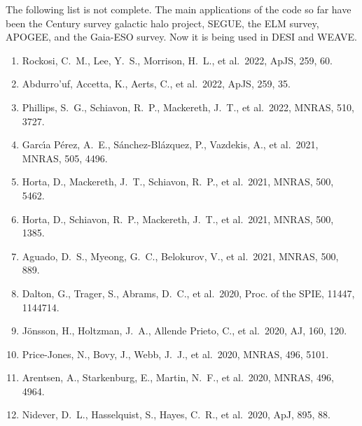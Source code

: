 \documentclass[12pt]{article}
\newcommand{\aj}{AJ}
\newcommand{\apj}{ApJ}
\newcommand{\apjs}{ApJS}
\newcommand{\mnras}{MNRAS}
\newcommand{\procspie}{Proc. of the SPIE}
\begin{document}
The following list is not complete. The main applications of the code so far 
have been the Century survey galactic halo project, SEGUE, the ELM survey, 
APOGEE, and the Gaia-ESO survey. Now it is being used in DESI and WEAVE.

\begin{enumerate}

\item Rockosi, C.~M., Lee, Y.~S., Morrison, H.~L., et al.\ 2022, \apjs, 259, 60. %

\item Abdurro'uf, Accetta, K., Aerts, C., et al.\ 2022, \apjs, 259, 35. %

\item Phillips, S.~G., Schiavon, R.~P., Mackereth, J.~T., et al.\ 2022, \mnras, 510, 3727. %

\item Garc{\'\i}a P{\'e}rez, A.~E., S{\'a}nchez-Bl{\'a}zquez, P., Vazdekis, A., et al.\ 2021, \mnras, 505, 4496. %

\item Horta, D., Mackereth, J.~T., Schiavon, R.~P., et al.\ 2021, \mnras, 500, 5462. %

\item Horta, D., Schiavon, R.~P., Mackereth, J.~T., et al.\ 2021, \mnras, 500, 1385. %

\item Aguado, D.~S., Myeong, G.~C., Belokurov, V., et al.\ 2021, \mnras, 500, 889. %

\item Dalton, G., Trager, S., Abrams, D.~C., et al.\ 2020, \procspie, 11447, 1144714. %

\item J{\"o}nsson, H., Holtzman, J.~A., Allende Prieto, C., et al.\ 2020, \aj, 160, 120. %

\item Price-Jones, N., Bovy, J., Webb, J.~J., et al.\ 2020, \mnras, 496, 5101. %

\item Arentsen, A., Starkenburg, E., Martin, N.~F., et al.\ 2020, \mnras, 496, 4964. %

\item Nidever, D.~L., Hasselquist, S., Hayes, C.~R., et al.\ 2020, \apj, 895, 88. %


\end{enumerate}
\end{document}
